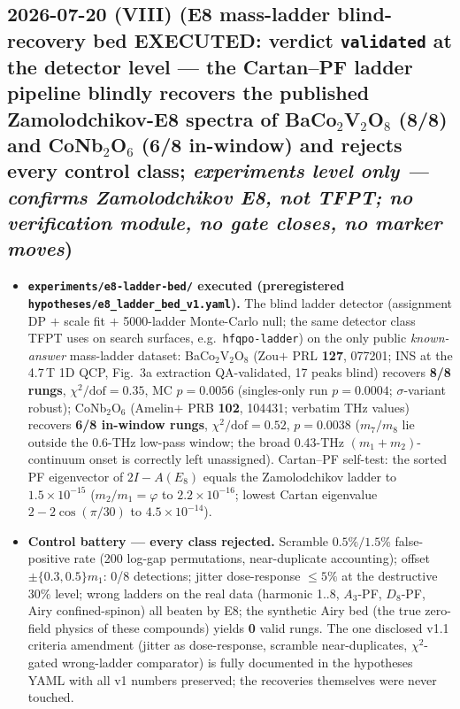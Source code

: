 \documentclass[11pt]{article}
\begin{document}
\subsection*{2026-07-20 (VIII) (E8 mass-ladder blind-recovery bed EXECUTED: verdict \texttt{validated} at the detector level --- the Cartan--PF ladder pipeline blindly recovers the published Zamolodchikov-E8 spectra of BaCo$_2$V$_2$O$_8$ (8/8) and CoNb$_2$O$_6$ (6/8 in-window) and rejects every control class; \emph{experiments level only --- confirms Zamolodchikov E8, not TFPT; no verification module, no gate closes, no marker moves})}
\begin{itemize}[leftmargin=1.5em]
\item \textbf{\texttt{experiments/e8-ladder-bed/} executed (preregistered \texttt{hypotheses/e8\_ladder\_bed\_v1.yaml}).}
The blind ladder detector (assignment DP $+$ scale fit $+$ 5000-ladder Monte-Carlo null; the same detector
class TFPT uses on search surfaces, e.g.\ \texttt{hfqpo-ladder}) on the only public \emph{known-answer}
mass-ladder dataset: BaCo$_2$V$_2$O$_8$ (Zou$+$ PRL \textbf{127}, 077201; INS at the 4.7\,T 1D QCP, Fig.~3a
extraction QA-validated, 17 peaks blind) recovers \textbf{8/8 rungs}, $\chi^2/\mathrm{dof}=0.35$, MC
$p=0.0056$ (singles-only run $p=0.0004$; $\sigma$-variant robust); CoNb$_2$O$_6$ (Amelin$+$ PRB
\textbf{102}, 104431; verbatim THz values) recovers \textbf{6/8 in-window rungs},
$\chi^2/\mathrm{dof}=0.52$, $p=0.0038$ ($m_7/m_8$ lie outside the 0.6-THz low-pass window; the broad
0.43-THz $(m_1{+}m_2)$-continuum onset is correctly left unassigned). Cartan--PF self-test: the sorted PF
eigenvector of $2I-A(E_8)$ equals the Zamolodchikov ladder to $1.5\times10^{-15}$ ($m_2/m_1=\varphi$ to
$2.2\times10^{-16}$; lowest Cartan eigenvalue $2-2\cos(\pi/30)$ to $4.5\times10^{-14}$).
\item \textbf{Control battery --- every class rejected.} Scramble $0.5\%/1.5\%$ false-positive rate
(200 log-gap permutations, near-duplicate accounting); offset $\pm\{0.3,0.5\}m_1$: 0/8 detections; jitter
dose-response $\le5\%$ at the destructive $30\%$ level; wrong ladders on the real data (harmonic 1..8,
$A_3$-PF, $D_8$-PF, Airy confined-spinon) all beaten by E8; the synthetic Airy bed (the true zero-field
physics of these compounds) yields \textbf{0} valid rungs. The one disclosed v1.1 criteria amendment
(jitter as dose-response, scramble near-duplicates, $\chi^2$-gated wrong-ladder comparator) is fully
documented in the hypotheses YAML with all v1 numbers preserved; the recoveries themselves were never touched.

\end{itemize}
\end{document}
